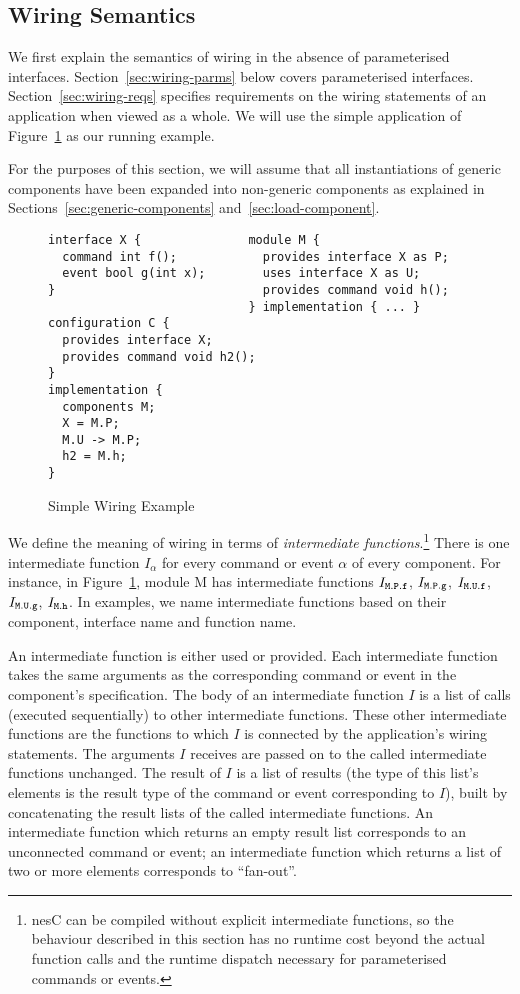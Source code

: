 \documentclass[11pt,letterpaper]{article}
\newcommand{\code}[1]{{\tt #1}}
\newcommand{\nesc}{nesC\xspace}
\begin{document}
\subsection{Wiring Semantics}
\label{sec:wiring-semantics}

We first explain the semantics of wiring in the absence of parameterised
interfaces. Section~\ref{sec:wiring-parms} below covers parameterised
interfaces. Section~\ref{sec:wiring-reqs} specifies requirements
on the wiring statements of an application when viewed as a whole. We will
use the simple application of Figure~\ref{fig:wiring} as our running
example.

For the purposes of this section, we will assume that all instantiations of
generic components have been expanded into non-generic components as
explained in Sections~\ref{sec:generic-components}
and~\ref{sec:load-component}.

\begin{figure}
\begin{verbatim}
interface X {               module M {
  command int f();            provides interface X as P;
  event bool g(int x);        uses interface X as U;
}                             provides command void h();
                            } implementation { ... }
configuration C {
  provides interface X;
  provides command void h2();
}
implementation {
  components M;
  X = M.P;
  M.U -> M.P;
  h2 = M.h;
}  
\end{verbatim}
\caption{Simple Wiring Example}
\label{fig:wiring}
\end{figure}

We define the meaning of wiring in terms of \emph{intermediate
functions}.\footnote{\nesc can be compiled without explicit intermediate
functions, so the behaviour described in this section has no runtime cost
beyond the actual function calls and the runtime dispatch necessary for
parameterised commands or events.}  There is one intermediate function
$I_\alpha$ for every command or event $\alpha$ of every component. For
instance, in Figure~\ref{fig:wiring}, module M has intermediate functions
$I_\code{M.P.f}$, $I_\code{M.P.g}$, $I_\code{M.U.f}$, $I_\code{M.U.g}$,
$I_\code{M.h}$.  In examples, we name intermediate functions based on their
component, interface name and function name.

An intermediate function is either used or provided. Each intermediate
function takes the same arguments as the corresponding command or
event in the component's specification. The body of an intermediate
function $I$ is a list of calls (executed sequentially) to other
intermediate functions. These other intermediate functions are the
functions to which $I$ is connected by the application's wiring
statements. The arguments $I$ receives are passed on to the called
intermediate functions unchanged. The result of $I$ is a list of
results (the type of this list's elements is the result type of the
command or event corresponding to $I$), built by concatenating the
result lists of the called intermediate functions. An intermediate
function which returns an empty result list corresponds to an
unconnected command or event; an intermediate function which returns a
list of two or more elements corresponds to ``fan-out''.
\end{document}
